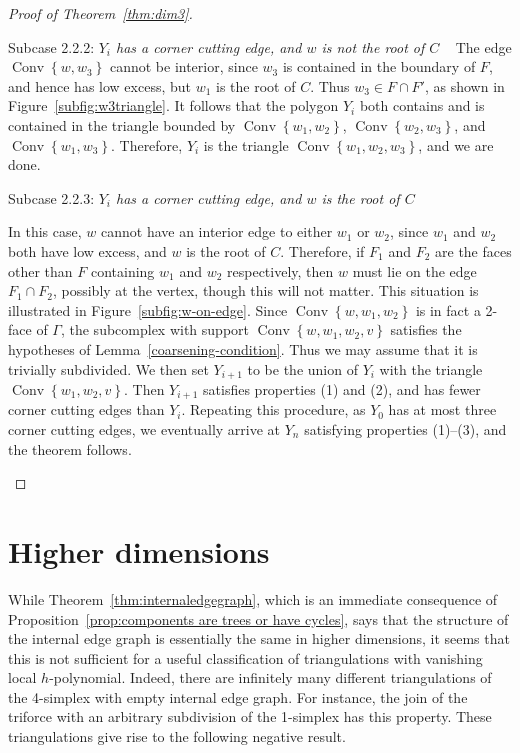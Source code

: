 \documentclass[ALCO,ThmDefs,Unicode,epreuves]{cedram}
\DeclareMathOperator{\Convop}{Conv}
\newcommand{\Conv}[1]{\Convop\left\{{#1}\right\}}
\newenvironment{proofsection}[2]{\begin{enonce*}[remark]{#1 \emph{#2}} \ }{\end{enonce*}}
\begin{document}
\begin{proof}[Proof of Theorem~\ref{thm:dim3}]
\begin{proofsection}{Subcase 2.2.2:}{$Y_i$ has a corner cutting edge, and $w$ is not the root of $C$}
The edge $\Conv{w,w_3}$ cannot be interior, since $w_3$ is contained in the boundary of $F$, and hence has low excess, but $w_1$ is the root of $C$. Thus $w_3 \in F\cap F'$, as shown in Figure~\ref{subfig:w3triangle}. It follows that the polygon $Y_i$ both contains and is contained in the triangle bounded by $\Conv{w_1, w_2}$, $\Conv{w_2, w_3}$, and $\Conv{w_1, w_3}$. Therefore, $Y_i$ is the triangle $\Conv{w_1, w_2, w_3}$, and we are done.
\end{proofsection}

\begin{proofsection}{Subcase 2.2.3:}{$Y_i$ has a corner cutting edge, and $w$ is the root of $C$}

In this case, $w$ cannot have an interior edge to either $w_1$ or $w_2$, since $w_1$ and $w_2$ both have low excess, and $w$ is the root of $C$. Therefore, if $F_1$ and $F_2$ are the faces other than $F$ containing $w_1$ and $w_2$ respectively, then $w$ must lie on the edge $F_1\cap F_2$, possibly at the vertex, though this will not matter. This situation is illustrated in Figure~\ref{subfig:w-on-edge}. Since $\Conv{w,w_1,w_2}$ is in fact a 2-face of $\Gamma$, the subcomplex with support $\Conv{w,w_1,w_2,v}$ satisfies the hypotheses of Lemma~\ref{coarsening-condition}. Thus we may assume that it is trivially subdivided. We then set $Y_{i+1}$ to be the union of $Y_i$ with the triangle $\Conv{w_1, w_2, v}$. Then $Y_{i+1}$ satisfies properties (1) and (2), and has fewer corner cutting edges than $Y_i$. Repeating this procedure, as $Y_0$ has at most three corner cutting edges, we eventually arrive at $Y_n$ satisfying properties (1)--(3), and the theorem follows.\qedhere
\end{proofsection}
\end{proof}

\section{Higher dimensions} \label{sec:higherdim}

While Theorem~\ref{thm:internaledgegraph}, which is an immediate consequence of Proposition~\ref{prop:components are trees or have cycles}, says that the structure of the internal edge graph is essentially the same in higher dimensions, it seems that this is not sufficient for a useful classification of triangulations with vanishing local $h$-polynomial. Indeed, there are infinitely many different triangulations of the 4-simplex with empty internal edge graph. For instance, the join of the triforce with an arbitrary subdivision of the 1-simplex has this property. These triangulations give rise to the following negative result.
\end{document}
